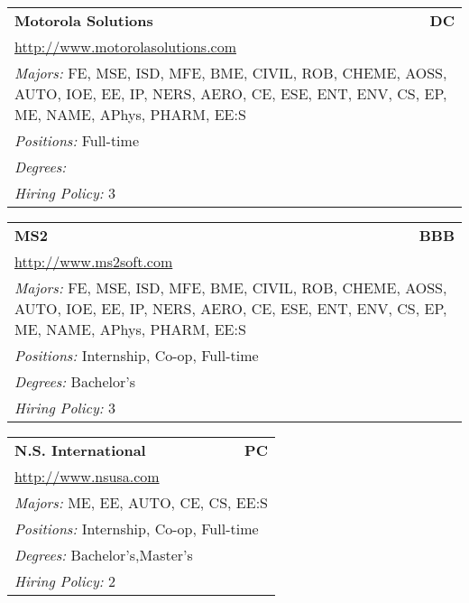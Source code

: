 \documentclass[twoside]{article}
\begin{document}
\begin{center}
\begin{multicols}{3}
\begin{FlushLeft}
\begin{minipage}{\columnwidth}\begin{tabularx}{.95\columnwidth}{Xr}
                 {\Large\bf Motorola Solutions} & {\Large\bf DC}\\
    \multicolumn{2}{p{.95\columnwidth}}{\url{http://www.motorolasolutions.com}}\\
    \multicolumn{2}{p{.95\columnwidth}}{\emph{Majors:} FE, MSE, ISD, MFE, BME, CIVIL, ROB, CHEME, AOSS, AUTO, IOE, EE, IP, NERS, AERO, CE, ESE, ENT, ENV, CS, EP, ME, NAME, APhys, PHARM, EE:S}\\
    \multicolumn{2}{p{.95\columnwidth}}{\emph{Positions:} Full-time}\\
    \multicolumn{2}{p{.95\columnwidth}}{\emph{Degrees:} }\\
    \multicolumn{2}{p{.95\columnwidth}}{\emph{Hiring Policy:} 3}\\
    \end{tabularx}
    
\end{minipage}
 
\begin{minipage}{\columnwidth}\begin{tabularx}{.95\columnwidth}{Xr}
                 {\Large\bf MS2} & {\Large\bf BBB}\\
    \multicolumn{2}{p{.95\columnwidth}}{\url{http://www.ms2soft.com}}\\
    \multicolumn{2}{p{.95\columnwidth}}{\emph{Majors:} FE, MSE, ISD, MFE, BME, CIVIL, ROB, CHEME, AOSS, AUTO, IOE, EE, IP, NERS, AERO, CE, ESE, ENT, ENV, CS, EP, ME, NAME, APhys, PHARM, EE:S}\\
    \multicolumn{2}{p{.95\columnwidth}}{\emph{Positions:} Internship, Co-op, Full-time}\\
    \multicolumn{2}{p{.95\columnwidth}}{\emph{Degrees:} Bachelor's}\\
    \multicolumn{2}{p{.95\columnwidth}}{\emph{Hiring Policy:} 3}\\
    \end{tabularx}
    
\end{minipage}
 
\begin{minipage}{\columnwidth}\begin{tabularx}{.95\columnwidth}{Xr}
                 {\Large\bf N.S. International} & {\Large\bf PC}\\
    \multicolumn{2}{p{.95\columnwidth}}{\url{http://www.nsusa.com}}\\
    \multicolumn{2}{p{.95\columnwidth}}{\emph{Majors:} ME, EE, AUTO, CE, CS, EE:S}\\
    \multicolumn{2}{p{.95\columnwidth}}{\emph{Positions:} Internship, Co-op, Full-time}\\
    \multicolumn{2}{p{.95\columnwidth}}{\emph{Degrees:} Bachelor's,Master's}\\
    \multicolumn{2}{p{.95\columnwidth}}{\emph{Hiring Policy:} 2}\\
    \end{tabularx}
    

\end{minipage}
\end{FlushLeft}
\end{multicols}
\end{center}
\end{document}
